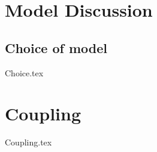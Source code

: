 \chapter{Model Discussion}\label{ch:modelDis}

\section{Choice of model}
{Choice.tex}

\newpage
\chapter{Coupling}
{Coupling.tex}
